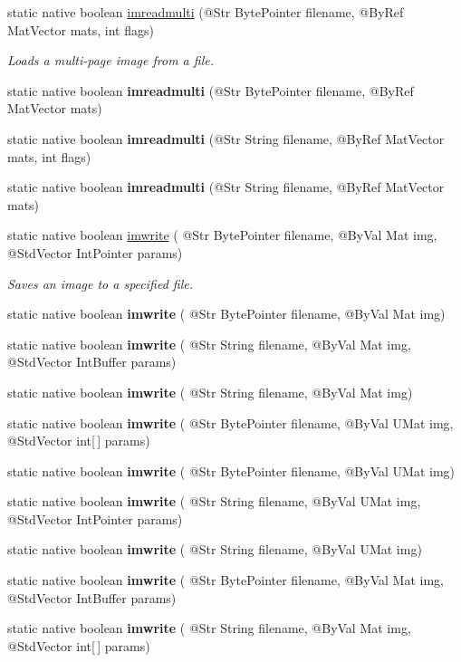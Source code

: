 \begin{DoxyCompactItemize}
static native boolean \hyperlink{group__imgcodecs_ga4e94bb9f788558a0b9eb892cc7a33bb9}{imreadmulti} (@Str Byte\+Pointer filename, @By\+Ref Mat\+Vector mats, int flags)
\begin{DoxyCompactList}\small\item\em Loads a multi-\/page image from a file. \end{DoxyCompactList}\item 
static native boolean {\bfseries imreadmulti} (@Str Byte\+Pointer filename, @By\+Ref Mat\+Vector mats)
\item 
static native boolean {\bfseries imreadmulti} (@Str String filename, @By\+Ref Mat\+Vector mats, int flags)
\item 
static native boolean {\bfseries imreadmulti} (@Str String filename, @By\+Ref Mat\+Vector mats)
\item 
static native boolean \hyperlink{group__imgcodecs_ga6a41cdd78ff2dd6fff47515e6d60212c}{imwrite} ( @Str Byte\+Pointer filename, @By\+Val Mat img, @Std\+Vector Int\+Pointer params)
\begin{DoxyCompactList}\small\item\em Saves an image to a specified file. \end{DoxyCompactList}\item 
static native boolean {\bfseries imwrite} ( @Str Byte\+Pointer filename, @By\+Val Mat img)
\item 
static native boolean {\bfseries imwrite} ( @Str String filename, @By\+Val Mat img, @Std\+Vector Int\+Buffer params)
\item 
static native boolean {\bfseries imwrite} ( @Str String filename, @By\+Val Mat img)
\item 
static native boolean {\bfseries imwrite} ( @Str Byte\+Pointer filename, @By\+Val U\+Mat img, @Std\+Vector int\mbox{[}$\,$\mbox{]} params)
\item 
static native boolean {\bfseries imwrite} ( @Str Byte\+Pointer filename, @By\+Val U\+Mat img)
\item 
static native boolean {\bfseries imwrite} ( @Str String filename, @By\+Val U\+Mat img, @Std\+Vector Int\+Pointer params)
\item 
static native boolean {\bfseries imwrite} ( @Str String filename, @By\+Val U\+Mat img)
\item 
static native boolean {\bfseries imwrite} ( @Str Byte\+Pointer filename, @By\+Val Mat img, @Std\+Vector Int\+Buffer params)
\item 
static native boolean {\bfseries imwrite} ( @Str String filename, @By\+Val Mat img, @Std\+Vector int\mbox{[}$\,$\mbox{]} params)

\end{DoxyCompactItemize}
